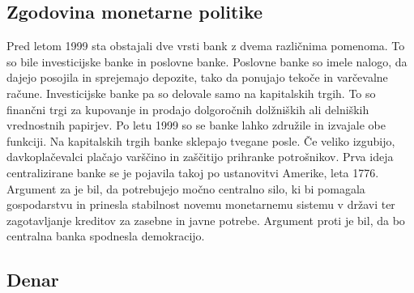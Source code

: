 \documentclass[letterpaper, titlepage, freqn]{article}
\begin{document}
\subsection{Zgodovina monetarne politike}

Pred letom 1999 sta obstajali dve vrsti bank z dvema različnima pomenoma. To so bile investicijske banke in poslovne banke. Poslovne banke so imele nalogo, da dajejo posojila in sprejemajo depozite, tako da ponujajo tekoče in varčevalne račune. Investicijske banke pa so delovale samo na kapitalskih trgih. To so finančni trgi za kupovanje in prodajo dolgoročnih dolžniških ali delniških vrednostnih papirjev.
Po letu 1999 so se banke lahko združile in izvajale obe funkciji. Na kapitalskih trgih banke sklepajo tvegane posle. Če veliko izgubijo, davkoplačevalci plačajo varščino in zaščitijo prihranke potrošnikov.
Prva ideja centralizirane banke se je pojavila takoj po ustanovitvi Amerike, leta 1776. Argument za je bil, da potrebujejo močno centralno silo, ki bi pomagala gospodarstvu in prinesla stabilnost novemu monetarnemu sistemu v državi ter zagotavljanje kreditov za zasebne in javne potrebe. Argument proti je bil, da bo centralna banka spodnesla demokracijo.\\

\subsection{Denar}
\end{document}
